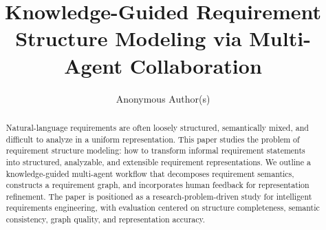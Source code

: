 \documentclass[sigconf,anonymous,review]{acmart}
\title[Knowledge-Guided Requirement Structure Modeling]{Knowledge-Guided Requirement Structure Modeling via Multi-Agent Collaboration}
\author{Anonymous Author(s)}
\affiliation{
  \institution{Anonymous Institution}
  \country{Anonymous Country}
}
\begin{document}
\begin{abstract}
Natural-language requirements are often loosely structured, semantically mixed, and difficult to analyze in a uniform representation.
This paper studies the problem of requirement structure modeling: how to transform informal requirement statements into structured, analyzable, and extensible requirement representations.
We outline a knowledge-guided multi-agent workflow that decomposes requirement semantics, constructs a requirement graph, and incorporates human feedback for representation refinement.
The paper is positioned as a research-problem-driven study for intelligent requirements engineering, with evaluation centered on structure completeness, semantic consistency, graph quality, and representation accuracy.
\end{abstract}



\maketitle



















\appendix



\end{document}
